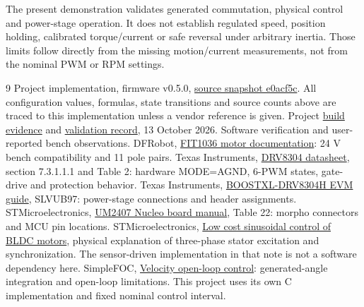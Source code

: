 \documentclass[11pt,letterpaper]{article}
\begin{document}
The present demonstration validates generated commutation, physical control
and power-stage operation. It does not establish regulated speed, position
holding, calibrated torque/current or safe reversal under arbitrary inertia.
Those limits follow directly from the missing motion/current measurements,
not from the nominal PWM or RPM settings.

\FloatBarrier
\begin{thebibliography}{9}
\small
{} Project implementation, firmware v0.5.0,
\href{https://github.com/aaronhyzhang/lasertrackinggimbal-ece445/tree/e0acf5c962c5c35e43c126dc870b25a3903abaed/firmware/Senior_Design_DEV_FW}{source snapshot e0acf5c}.
All configuration values, formulas, state transitions and source counts above
are traced to this implementation unless a vendor reference is given.
 Project
\href{https://github.com/aaronhyzhang/lasertrackinggimbal-ece445/blob/e0acf5c962c5c35e43c126dc870b25a3903abaed/firmware/Senior_Design_DEV_FW/docs/build_evidence.json}{build evidence}
and
\href{https://github.com/aaronhyzhang/lasertrackinggimbal-ece445/blob/e0acf5c962c5c35e43c126dc870b25a3903abaed/firmware/Senior_Design_DEV_FW/docs/VALIDATION.md}{validation record},
13 October 2026. Software verification and user-reported bench observations.
 DFRobot,
\href{https://wiki.dfrobot.com/fit1036/}{FIT1036 motor documentation}:
24 V bench compatibility and 11 pole pairs.
 Texas Instruments,
\href{https://www.ti.com/lit/ds/symlink/drv8304.pdf}{DRV8304 datasheet},
section 7.3.1.1.1 and Table 2: hardware MODE=AGND, 6-PWM states,
gate-drive and protection behavior.
 Texas Instruments,
\href{https://www.ti.com/lit/ug/slvub97/slvub97.pdf}{BOOSTXL-DRV8304H EVM guide},
SLVUB97: power-stage connections and header assignments.
 STMicroelectronics,
\href{https://www.st.com/resource/en/user_manual/um2407-stm32h7-nucleo144-boards-mb1364-stmicroelectronics.pdf}{UM2407 Nucleo board manual},
Table 22: morpho connectors and MCU pin locations.
 STMicroelectronics,
\href{https://www.st.com/resource/en/application_note/cd00110782-low-cost-sinusoidal-control-of-bldc-motors-with-hall-sensors-using-st7fmc-stmicroelectronics.pdf}{Low cost sinusoidal control of BLDC motors},
physical explanation of three-phase stator excitation and synchronization.
The sensor-driven implementation in that note is not a software dependency here.
 SimpleFOC,
\href{https://docs.simplefoc.com/velocity_openloop}{Velocity open-loop control}:
generated-angle integration and open-loop limitations. This project uses its
own C implementation and fixed nominal control interval.
\end{thebibliography}
\end{document}
